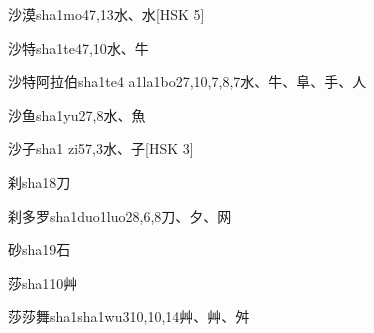 \begin{EntryWithPhonetic}{沙漠}{sha1mo4}{7,13}{⽔、⽔}[HSK 5]
\end{EntryWithPhonetic}

\begin{EntryWithPhonetic}{沙特}{sha1te4}{7,10}{⽔、⽜}
\end{EntryWithPhonetic}

\begin{EntryWithPhonetic}{沙特阿拉伯}{sha1te4 a1la1bo2}{7,10,7,8,7}{⽔、⽜、⾩、⼿、⼈}
\end{EntryWithPhonetic}

\begin{EntryWithPhonetic}{沙鱼}{sha1yu2}{7,8}{⽔、⿂}
\end{EntryWithPhonetic}

\begin{EntryWithPhonetic}{沙子}{sha1 zi5}{7,3}{⽔、⼦}[HSK 3]
\end{EntryWithPhonetic}

\begin{EntryWithPhonetic}{刹}{sha1}{8}{⼑}
\end{EntryWithPhonetic}

\begin{EntryWithPhonetic}{刹多罗}{sha1duo1luo2}{8,6,8}{⼑、⼣、⽹}
\end{EntryWithPhonetic}

\begin{EntryWithPhonetic}{砂}{sha1}{9}{⽯}
\end{EntryWithPhonetic}

\begin{EntryWithPhonetic}{莎}{sha1}{10}{⾋}
\end{EntryWithPhonetic}

\begin{EntryWithPhonetic}{莎莎舞}{sha1sha1wu3}{10,10,14}{⾋、⾋、⾇}
\end{EntryWithPhonetic}

